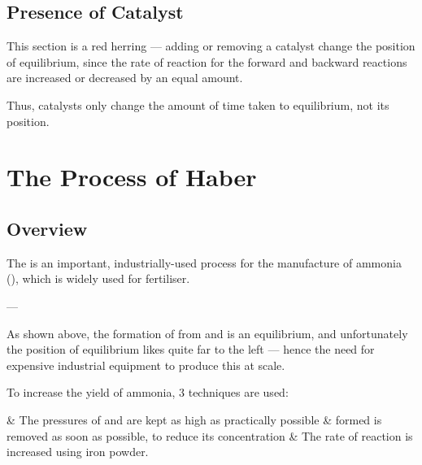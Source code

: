 

		\subsection{Presence of Catalyst}

			This section is a red herring --- adding or removing a catalyst  change the position of equilibrium, since the
			rate of reaction for  the forward and backward reactions are increased or decreased by an equal amount.

			Thus, catalysts only change the amount of time taken to  equilibrium, not its position.




	\pagebreak
	\section{The Process of Haber}

		\subsection{Overview}

			The  is an important, industrially-used process for the manufacture of ammonia (), which is widely
			used for fertiliser.


			--- 

			As shown above, the formation of  from  and  is an equilibrium, and unfortunately the position of equilibrium
			likes quite far to the left --- hence the need for expensive industrial equipment to produce this at scale.




			To increase the yield of ammonia, 3 techniques are used:


			\begin{bulletlist}
				& The pressures of  and  are kept as high as practically possible
				&  formed is removed as soon as possible, to reduce its concentration
				& The rate of reaction is increased using iron powder.
			\end{bulletlist}

